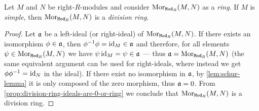 \begin{corollary}
    \label{cor:M-simple-Mor-division-ring}
    Let \(M\) and \(N\) be right-\(R\)-modules and consider
    \(\operatorname{Mor}_{{\texttt{Mod}_{R}}}(M, N)\) as a \emph{ring}. If \(M\) is \emph{simple}, then
    \(\operatorname{Mor}_{{\texttt{Mod}_{R}}}(M, N)\) is a \emph{division ring}.
\end{corollary}

\begin{proof}
    Let \(\mathfrak{a}\) be a left-ideal (or right-ideal) of \(\operatorname{Mor}_{{\texttt{Mod}_{R}}}(M,
    N)\). If there exists an isomorphism \(\phi \in \mathfrak{a}\), then
    \(\phi^{-1} \phi = \operatorname{id}_M \in \mathfrak{a}\) and therefore, for all elements
    \(\psi \in \operatorname{Mor}_{{\texttt{Mod}_{R}}}(M, N)\) we have \(\psi \operatorname{id}_M = \psi \in \mathfrak{a}\)
    --- thus \(\mathfrak{a} = \operatorname{Mor}_{{\texttt{Mod}_{R}}}(M, N)\) (the same equivalent argument can
    be used for right-ideals, where instead we get \(\phi \phi^{-1} = \operatorname{id}_N\) in the
    ideal). If there exist no isomorphism in \(\mathfrak{a}\), by
    \cref{lem:schur-lemma} it is only composed of the zero morphism, thus
    \(\mathfrak{a} = 0\). From \cref{prop:division-ring-ideals-are-0-or-ring} we
    conclude that \(\operatorname{Mor}_{{\texttt{Mod}_{R}}}(M, N)\) is a division ring.
\end{proof}

